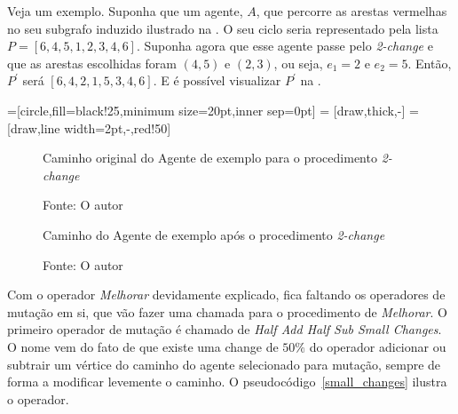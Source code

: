 Veja um exemplo. Suponha que um agente, $A$, que percorre as arestas vermelhas 
no seu subgrafo induzido ilustrado na . O seu ciclo seria 
representado pela lista $P = [6,4,5,1,2,3,4,6]$. Suponha agora que esse agente 
passe pelo \textit{2-change} e que as arestas escolhidas foram $(4,5)$ e $(2,3)$, 
ou seja, $e_{1} = 2$ e $e_{2} = 5$. Então, $P^{\prime}$ será 
$[6,4,2,1,5,3,4,6]$. E é possível visualizar $P^{\prime}$ na 
.

=[circle,fill=black!25,minimum size=20pt,inner sep=0pt]
 = [draw,thick,-]
 = [draw,line width=2pt,-,red!50]

\begin{figure}
	\caption{Caminho original do Agente de exemplo para o procedimento \textit{2-change}}
	\centering
	\caption*{Fonte: O autor}
	\label{2_change_ex1}
\end{figure}

\begin{figure}
	\caption{Caminho do Agente de exemplo após o procedimento \textit{2-change}}
	\centering
	\caption*{Fonte: O autor}
	\label{2_change_ex2}
\end{figure}

Com o operador \textit{Melhorar} devidamente explicado, fica faltando os 
operadores de mutação em si, que vão fazer uma chamada para o procedimento de 
\textit{Melhorar}. O primeiro operador de mutação é chamado de 
\textit{Half Add Half Sub Small Changes}. O nome vem do fato de que existe 
uma change de $50\%$ do operador adicionar ou subtrair um vértice do caminho do 
agente selecionado para mutação, sempre de forma a modificar levemente o caminho.
O pseudocódigo~\ref{small_changes} ilustra o operador.

